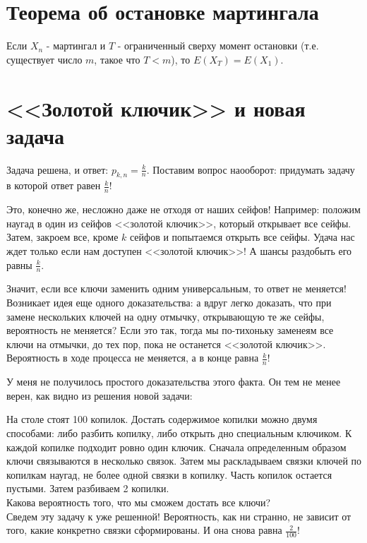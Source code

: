 \documentclass[pdftex,12pt,a4paper]{article}
\begin{document}
\section{Теорема об остановке мартингала}
Если $X_{n}$ - мартингал и $T$ - ограниченный сверху момент остановки (т.е. существует число $m$, такое что $T<m$), то $E(X_{T})=E(X_{1})$. 




\section{ <<Золотой ключик>> и новая задача}
Задача решена, и ответ: $p_{k,n}=\frac{k}{n}$. Поставим вопрос наооборот: придумать задачу в которой ответ равен $\frac{k}{n}$!

Это, конечно же, несложно даже не отходя от наших сейфов! Например: положим наугад в один из сейфов <<золотой ключик>>, который открывает все сейфы. Затем, закроем все, кроме $k$ сейфов и попытаемся открыть все сейфы. Удача нас ждет только если нам доступен <<золотой ключик>>! А шансы раздобыть его равны $\frac{k}{n}$.

Значит, если все ключи заменить одним универсальным, то ответ не меняется! Возникает идея еще одного доказательства: а вдруг легко доказать, что при замене нескольких ключей на одну отмычку, открывающую те же сейфы, вероятность не меняется? Если это так, тогда мы по-тихоньку заменеям все ключи на отмычки, до тех пор, пока не останется <<золотой ключик>>. Вероятность в ходе процесса не меняется, а в конце равна $\frac{k}{n}$! 

У меня не получилось простого доказательства этого факта. Он тем не менее верен, как  видно из решения новой задачи: 

На столе стоят 100 копилок.
Достать содержимое копилки можно двумя способами: либо разбить
копилку, либо открыть дно специальным ключиком. К каждой копилке
подходит ровно один ключик. Сначала определенным образом ключи
связываются в несколько связок. Затем мы раскладываем связки
ключей по копилкам наугад, не более одной связки в копилку. Часть
копилок остается пустыми.
Затем разбиваем 2 копилки. \\
Какова вероятность того, что мы сможем достать все ключи? \\

Сведем эту задачу к уже решенной! Вероятность, как ни странно, не зависит от
того, какие конкретно
связки сформированы. И она снова равна $\frac{2}{100}$! \\
\end{document}
